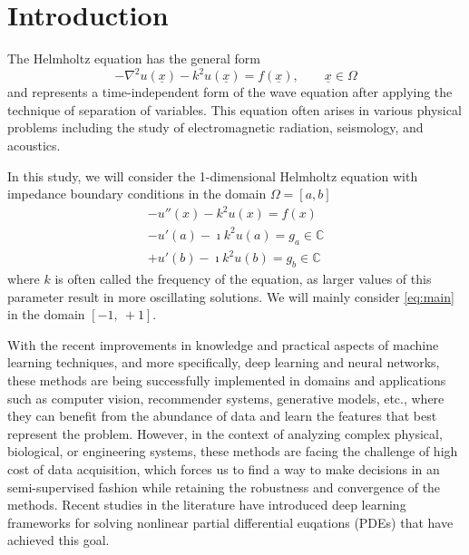 \section{Introduction}

The Helmholtz equation has the general form
\begin{equation}
    \label{eq:general}
    -\nabla^2{u(\underline{x})} - k^2 u(\underline{x}) = f(\underline{x}), \qquad \underline{x} \in \Omega
\end{equation}
and represents a time-independent form of the wave equation after applying the technique of separation of variables. This equation often arises in various physical problems including the study of electromagnetic radiation, seismology, and acoustics.

In this study, we will consider the 1-dimensional Helmholtz equation with impedance boundary conditions in the domain $\Omega=[a, b]$
\begin{equation}
    \label{eq:main}
    \begin{aligned}
        -u''(x) - k^2 u(x) = f(x)\\
        -u'(a) - \imath k^2 u(a) = g_a \in \mathbb{C}\\
        +u'(b) - \imath k^2 u(b) = g_b \in \mathbb{C}
    \end{aligned}
\end{equation}
where $k$ is often called the frequency of the equation, as larger values of this parameter result in more oscillating solutions. We will mainly consider \autoref{eq:main} in the domain $[-1,\:+1]$.

With the recent improvements in knowledge and practical aspects of machine learning techniques, and more specifically, deep learning and neural networks, these methods are being successfully implemented in domains and applications such as computer vision, recommender systems, generative models, etc., where they can benefit from the abundance of data and learn the features that best represent the problem. However, in the context of analyzing complex physical, biological, or engineering systems, these methods are facing the challenge of high cost of data acquisition, which forces us to find a way to make decisions in an semi-supervised fashion while retaining the robustness and convergence of the methods. Recent studies in the literature have introduced deep learning frameworks for solving nonlinear partial differential
euqations (PDEs) that have achieved this goal.

